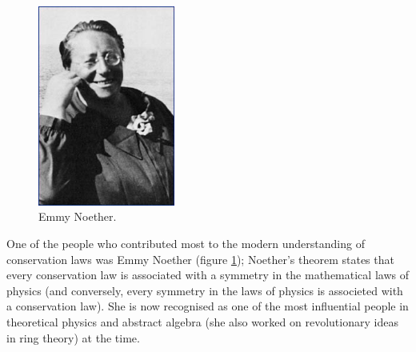 \documentclass[a4paper]{amsbook}
\newcommand\capcite[1]{}
\begin{document}
\begin{figure}
  \centering
  \includegraphics[width=0.4\textwidth]{noether}
  \caption{Emmy Noether. \capcite{http://www.amt.edu.au/images/root-imgs/biognoether.jpg}\label{fig:noether}}
\end{figure}
One of the people who contributed most to the modern understanding of conservation laws was Emmy Noether (figure \ref{fig:noether}); Noether's
theorem states that every conservation law is associated with a symmetry in the mathematical laws of physics (and conversely, every symmetry
in the laws of physics is associeted with a conservation law). She is now recognised as one of the most influential people in theoretical physics
and abstract algebra (she also worked on revolutionary ideas in ring theory) at the time.
\end{document}
